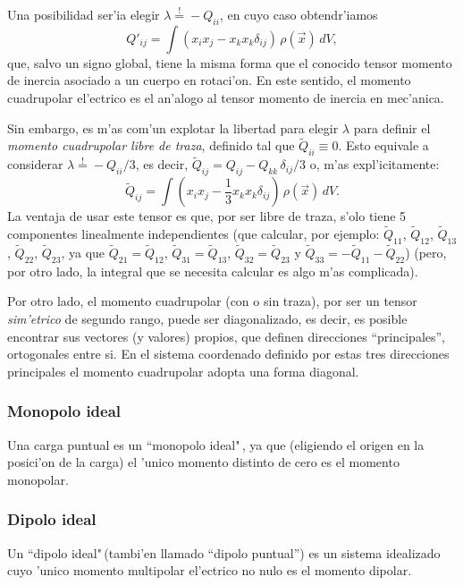 Una posibilidad ser'ia elegir $\lambda\stackrel{!}{=}-Q_{ii}$, en cuyo caso obtendr'iamos
\begin{equation}
 \boxed{Q'_{ij}=\int
(x_ix_j-x_kx_k\delta_{ij})\,\rho(\vec{x})\,dV,}
\end{equation}
que, salvo un signo global, tiene la misma forma que el conocido tensor momento de inercia asociado a un cuerpo en rotaci'on. En este sentido, el momento cuadrupolar el'ectrico es el an'alogo al tensor momento de inercia en mec'anica.

Sin embargo, es m'as com'un explotar la libertad para elegir $\lambda$ para definir el  \textit{momento cuadrupolar libre de traza}, definido tal que $\tilde{Q}_{ii}\equiv 0$. Esto equivale a considerar $\lambda\stackrel{!}{=}-Q_{ii}/3$, es decir, $\tilde{Q}_{ij}=Q_{ij}-Q_{kk}\,\delta_{ij}/3$ o,
m'as expl'icitamente:
\begin{equation}
 \boxed{\tilde{Q}_{ij}=\int
(x_ix_j-\frac{1}{3}x_kx_k\delta_{ij})\,\rho(\vec{x})\,dV.} \label{mom4st}
\end{equation}
La ventaja de usar este tensor es que, por ser libre de traza, s'olo tiene 5
componentes linealmente independientes (que calcular, por ejemplo:
$\tilde{Q}_{11}$, $\tilde{Q}_{12}$, $\tilde{Q}_{13}$, $\tilde{Q}_{22}$,
$\tilde{Q}_{23}$, ya que $\tilde{Q}_{21}=\tilde{Q}_{12}$,
$\tilde{Q}_{31}=\tilde{Q}_{13}$, $\tilde{Q}_{32}=\tilde{Q}_{23}$ y
$\tilde{Q}_{33}=-\tilde{Q}_{11}-\tilde{Q}_{22}$) (pero, por otro lado, la integral que se necesita calcular es algo m'as complicada).

Por otro lado, el momento cuadrupolar (con o sin traza), por ser un tensor \textit{sim'etrico} de segundo rango, puede ser diagonalizado, es decir, es posible encontrar sus vectores (y valores) propios, que definen direcciones ``principales'', ortogonales entre si. En el sistema coordenado definido por estas tres direcciones principales el momento cuadrupolar adopta una forma diagonal.


\subsubsection{Monopolo ideal}
Una carga puntual es un ``monopolo ideal"\,, ya que (eligiendo el origen en la posici'on de la carga) el 'unico momento distinto de cero es el momento monopolar. 

\subsubsection{Dipolo ideal}
Un ``dipolo ideal"\,(tambi'en llamado ``dipolo puntual'') es un sistema idealizado cuyo 'unico momento multipolar el'ectrico no nulo es el momento dipolar.

